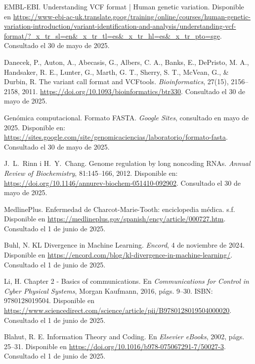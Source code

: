 \documentclass[11pt,spanish,listoffigures,listoftables]{tfgetsinf}
\begin{document}
\begin{thebibliography}{99}
   EMBL-EBI.  
   \newblock Understanding VCF format | Human genetic variation.  
   \newblock Disponible en 
   \newblock \url{https://www-ebi-ac-uk.translate.goog/training/online/courses/human-genetic-variation-introduction/variant-identification-and-analysis/understanding-vcf-format/?_x_tr_sl=en&_x_tr_tl=es&_x_tr_hl=es&_x_tr_pto=sge}.
   \newblock Consultado el 30 de mayo de 2025.
   
   Danecek, P., Auton, A., Abecasis, G., Albers, C. A., Banks, E., DePristo, M. A., Handsaker, R. E., Lunter, G., Marth, G. T., Sherry, S. T., McVean, G., \& Durbin, R.  
   \newblock The variant call format and VCFtools.  
   \newblock \textit{Bioinformatics}, 27(15), 2156–2158, 2011.  
   \newblock \url{https://doi.org/10.1093/bioinformatics/btr330}.
   \newblock Consultado el 30 de mayo de 2025.

   Genómica computacional.  
   \newblock Formato FASTA.  
   \newblock \textit{Google Sites}, consultado en mayo de 2025.  
   \newblock Disponible en: 
   \newblock \url{https://sites.google.com/site/genomicaciencias/laboratorio/formato-fasta}.
   \newblock Consultado el 30 de mayo de 2025.

   J.~L.~Rinn i H.~Y.~Chang.
   \newblock Genome regulation by long noncoding RNAs.
   \newblock \textit{Annual Review of Biochemistry}, 81:145--166, 2012.
   \newblock Disponible en:
   \newblock \url{https://doi.org/10.1146/annurev-biochem-051410-092902}.
   \newblock Consultado el 30 de mayo de 2025.

   MedlinePlus.  
   \newblock Enfermedad de Charcot-Marie-Tooth: enciclopedia médica.  
   \newblock s.f.  
   \newblock Disponible en  
   \url{https://medlineplus.gov/spanish/ency/article/000727.htm}.  
   \newblock Consultado el 1 de junio de 2025.

   Buhl, N.  
   \newblock KL Divergence in Machine Learning.  
   \newblock \textit{Encord}, 4 de noviembre de 2024.  
   \newblock Disponible en  
   \url{https://encord.com/blog/kl-divergence-in-machine-learning/}.  
   \newblock Consultado el 1 de junio de 2025.

   Li, H.  
   \newblock Chapter 2 - Basics of communications.  
   \newblock En \textit{Communications for Control in Cyber Physical Systems}, Morgan Kaufmann, 2016, págs. 9--30.  
   \newblock ISBN: 9780128019504.  
   \newblock Disponible en  
   \url{https://www.sciencedirect.com/science/article/pii/B9780128019504000020}.  
   \newblock Consultado el 1 de junio de 2025.

   Blahut, R. E.  
   \newblock Information Theory and Coding.  
   \newblock En \textit{Elsevier eBooks}, 2002, págs. 25--31.  
   \newblock Disponible en  
   \url{https://doi.org/10.1016/b978-075067291-7/50027-3}.  
   \newblock Consultado el 1 de junio de 2025.

   

\end{thebibliography}
\cleardoublepage
\end{document}
